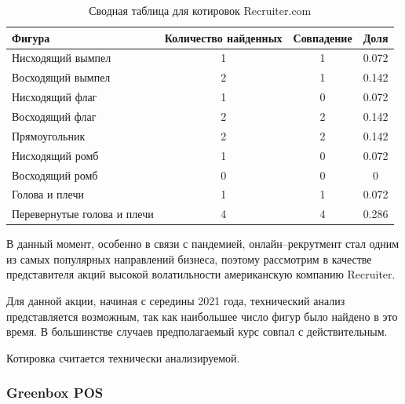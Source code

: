 \documentclass[bachelor, och, coursework]{SCWorks}
\begin{document}
    \begin{table}[!hbt]
        \caption{Сводная таблица для котировок Recruiter.com}
        \centering
        \begin{tabular}{|l|c|c|c|}
        \hline
        Фигура                      & \multicolumn{1}{l|}{Количество найденных} & Совпадение & Доля  \\ \hline
        Нисходящий вымпел           & 1                                         & 1          & 0.072 \\ \hline
        Восходящий вымпел           & 2                                         & 1          & 0.142 \\ \hline
        Нисходящий флаг             & 1                                         & 0          & 0.072 \\ \hline
        Восходящий флаг             & 2                                         & 2          & 0.142 \\ \hline
        Прямоугольник               & 2                                         & 2          & 0.142 \\ \hline
        Нисходящий ромб             & 1                                         & 0          & 0.072 \\ \hline
        Восходящий ромб             & 0                                         & 0          & 0     \\ \hline
        Голова и плечи              & 1                                         & 1          & 0.072 \\ \hline
        Перевернутые голова и плечи & 4                                         & 4          & 0.286 \\ \hline
        \end{tabular}    
    \end{table}

    В данный момент, особенно в связи с пандемией, онлайн--рекрутмент стал одним
    из самых популярных направлений бизнеса, поэтому рассмотрим в качестве
    представителя акций высокой волатильности американскую компанию Recruiter.

    Для данной акции, начиная с середины 2021 года, технический анализ
    представляется возможным, так как наибольшее число фигур было найдено в это
    время. В большинстве случаев предполагаемый курс совпал с действительным.
    
    Котировка считается технически анализируемой.

    \subsubsection{Greenbox POS}
    
\end{document}
